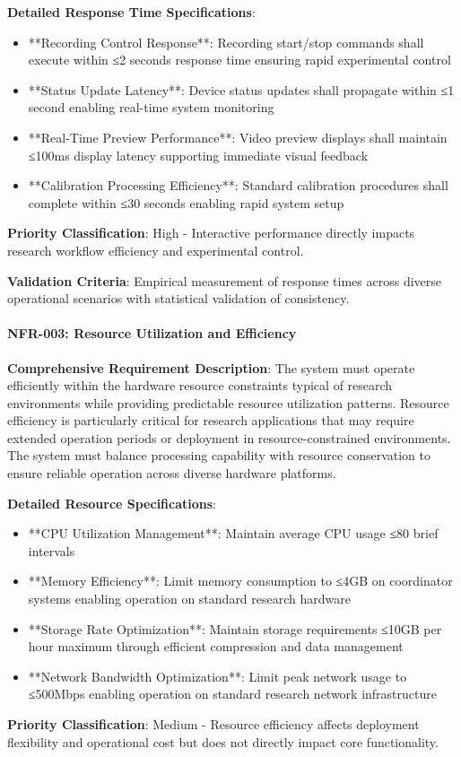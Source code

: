 \documentclass[12pt,a4paper]{report}
\begin{document}
\textbf{Detailed Response Time Specifications}:

\begin{itemize}
\item **Recording Control Response**: Recording start/stop commands shall execute within ≤2 seconds response time ensuring
  rapid experimental control
\item **Status Update Latency**: Device status updates shall propagate within ≤1 second enabling real-time system monitoring
\item **Real-Time Preview Performance**: Video preview displays shall maintain ≤100ms display latency supporting immediate
  visual feedback
\item **Calibration Processing Efficiency**: Standard calibration procedures shall complete within ≤30 seconds enabling
  rapid system setup

\end{itemize}
\textbf{Priority Classification}: High - Interactive performance directly impacts research workflow efficiency and
experimental control.

\textbf{Validation Criteria}: Empirical measurement of response times across diverse operational scenarios with statistical
validation of consistency.

\paragraph{NFR-003: Resource Utilization and Efficiency}

\textbf{Comprehensive Requirement Description}: The system must operate efficiently within the hardware resource constraints
typical of research environments while providing predictable resource utilization patterns. Resource efficiency is
particularly critical for research applications that may require extended operation periods or deployment in
resource-constrained environments. The system must balance processing capability with resource conservation to ensure
reliable operation across diverse hardware platforms.

\textbf{Detailed Resource Specifications}:

\begin{itemize}
\item **CPU Utilization Management**: Maintain average CPU usage ≤80%
  brief intervals
\item **Memory Efficiency**: Limit memory consumption to ≤4GB on coordinator systems enabling operation on standard research
  hardware
\item **Storage Rate Optimization**: Maintain storage requirements ≤10GB per hour maximum through efficient compression and
  data management
\item **Network Bandwidth Optimization**: Limit peak network usage to ≤500Mbps enabling operation on standard research
  network infrastructure

\end{itemize}
\textbf{Priority Classification}: Medium - Resource efficiency affects deployment flexibility and operational cost but does
not directly impact core functionality.
\end{document}
